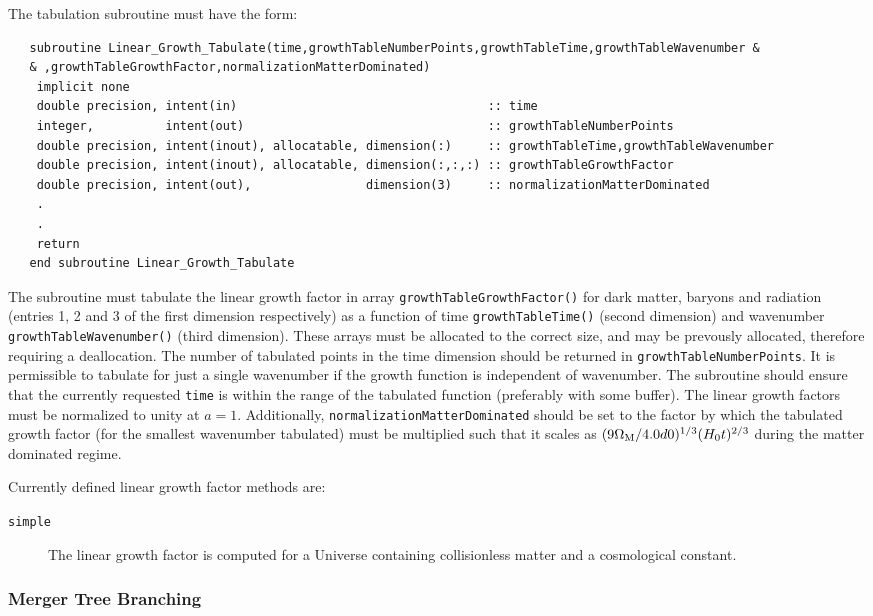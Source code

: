 The tabulation subroutine must have the form:
\begin{verbatim}
   subroutine Linear_Growth_Tabulate(time,growthTableNumberPoints,growthTableTime,growthTableWavenumber &
   & ,growthTableGrowthFactor,normalizationMatterDominated)
    implicit none
    double precision, intent(in)                                   :: time
    integer,          intent(out)                                  :: growthTableNumberPoints
    double precision, intent(inout), allocatable, dimension(:)     :: growthTableTime,growthTableWavenumber
    double precision, intent(inout), allocatable, dimension(:,:,:) :: growthTableGrowthFactor
    double precision, intent(out),                dimension(3)     :: normalizationMatterDominated
    .
    .
    return
   end subroutine Linear_Growth_Tabulate
\end{verbatim}
The subroutine must tabulate the linear growth factor in array {\tt growthTableGrowthFactor()} for dark matter, baryons and radiation (entries 1, 2 and 3 of the first dimension respectively) as a function of time {\tt growthTableTime()} (second dimension) and wavenumber {\tt growthTableWavenumber()} (third dimension). These arrays must be allocated to the correct size, and may be prevously allocated, therefore requiring a deallocation. The number of tabulated points in the time dimension should be returned in {\tt growthTableNumberPoints}. It is permissible to tabulate for just a single wavenumber if the growth function is independent of wavenumber. The subroutine should ensure that the currently requested {\tt time} is within the range of the tabulated function (preferably with some buffer). The linear growth factors must be normalized to unity at $a=1$. Additionally, {\tt normalizationMatterDominated} should be set to the factor by which the tabulated growth factor (for the smallest wavenumber tabulated) 
must be multiplied such that it scales as $(9 \Omega_{\rm M} / 4.0d0)^{1/3} (H_0 t)^{2/3}$ during the matter dominated regime.

Currently defined linear growth factor methods are:
\begin{description}
 \item [{\tt simple}] The linear growth factor is computed for a Universe containing collisionless matter and a cosmological constant.
\end{description}

\subsubsection{Merger Tree Branching}

